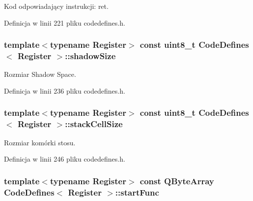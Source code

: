 Kod odpowiadający instrukcji\-: ret. 



Definicja w linii 221 pliku codedefines.\-h.

\hypertarget{class_code_defines_a89139a3f358c98200f78478fd0dd3bd9}{
\subsubsection[{shadow\-Size}]{\setlength{\rightskip}{0pt plus 5cm}template$<$typename Register$>$ const uint8\-\_\-t {\bf Code\-Defines}$<$ Register $>$\-::shadow\-Size\hspace{0.3cm}{\ttfamily [static]}}}\label{class_code_defines_a89139a3f358c98200f78478fd0dd3bd9}


Rozmiar Shadow Space. 



Definicja w linii 236 pliku codedefines.\-h.

\hypertarget{class_code_defines_add79526fe978503123140edf11497d66}{
\subsubsection[{stack\-Cell\-Size}]{\setlength{\rightskip}{0pt plus 5cm}template$<$typename Register$>$ const uint8\-\_\-t {\bf Code\-Defines}$<$ Register $>$\-::stack\-Cell\-Size\hspace{0.3cm}{\ttfamily [static]}}}\label{class_code_defines_add79526fe978503123140edf11497d66}


Rozmiar komórki stosu. 



Definicja w linii 246 pliku codedefines.\-h.

\hypertarget{class_code_defines_ab0339e357461e07258de4e77d0c73c5c}{
\subsubsection[{start\-Func}]{\setlength{\rightskip}{0pt plus 5cm}template$<$typename Register$>$ const Q\-Byte\-Array {\bf Code\-Defines}$<$ Register $>$\-::start\-Func\hspace{0.3cm}{\ttfamily [static]}}}\label{class_code_defines_ab0339e357461e07258de4e77d0c73c5c}


